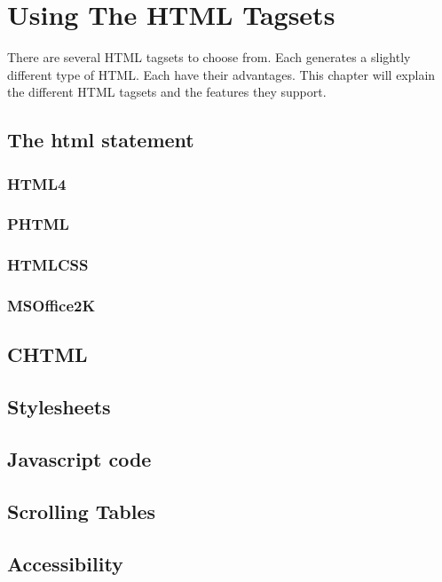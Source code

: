\documentclass{book}
\begin{document}
\chapter{Using The HTML Tagsets}
There are several HTML tagsets to choose from. Each generates
a slightly different type of HTML.  Each have their advantages.
This chapter will explain the different HTML tagsets and the
features they support.
\section{The html statement}

\subsection{HTML4}

\subsection{PHTML}

\subsection{HTMLCSS}

\subsection{MSOffice2K}

\section{CHTML}

\section{Stylesheets}

\section{Javascript code}

\section{Scrolling Tables}

\section{Accessibility}
\end{document}
